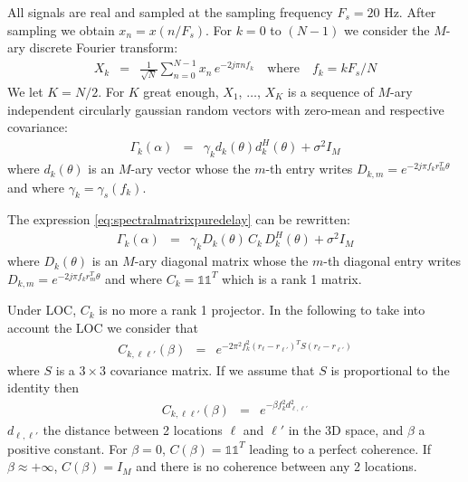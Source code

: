 \documentclass[a4paper, 12pt]{report}
\newcommand{\diag}[1]{\mathrm{diag}\left( #1 \right)}
\begin{document}
All signals are real and sampled at the sampling frequency  $F_{s}=20$ Hz. After sampling we obtain $x_{n}=x(n/F_{s})$. For $k=0$ to $(N-1)$ we consider the $M$-ary discrete Fourier transform:
 \begin{eqnarray*}
 X_{k}&=&\frac{1}{\sqrt{N}}\sum_{n=0}^{N-1}x_{n}\,e^{-2j\pi n f_{k}}
    \quad\mathrm{where}\quad
 f_{k}=kF_{s}/N
 \end{eqnarray*}
We let $K=N/2$.
For $K$ great enough, $X_{1}$, $\ldots$, $X_{K}$ is a sequence of  $M$-ary independent circularly gaussian random vectors with zero-mean and respective covariance:
\begin{eqnarray}
\label{eq:spectralmatrixpuredelay}
\Gamma_{k}(\alpha)&=&\gamma_{k}d_{k}(\theta)d_{k}^{H}(\theta)+\sigma^{2}I_{M}
\end{eqnarray}
where $d_{k}(\theta)$ is an $M$-ary vector whose the $m$-th entry writes $D_{k,m}=e^{-2j\pi f_{k} r_{m}^{T}\theta }$ and where $\gamma_{k}=\gamma_{s}(f_{k})$.

The expression \eqref{eq:spectralmatrixpuredelay} can be rewritten:
\begin{eqnarray}
\label{eq:spectralmatrixLOC}
\Gamma_{k}(\alpha)&=&\gamma_{k}D_{k}(\theta)\, C_{k}\,D_{k}^{H}(\theta)+\sigma^{2}I_{M}
\end{eqnarray}
where $D_{k}(\theta)$ is an $M$-ary diagonal matrix whose the $m$-th diagonal entry writes $D_{k,m}=e^{-2j\pi f_{k} r_{m}^{T}\theta }$ and where $C_{k}=\mathds{1}\mathds{1}^{T}$ which is a rank 1 matrix.


Under LOC, $C_{k}$ is no more a rank 1 projector.  In the following to take into account the LOC we consider that 
\begin{eqnarray}
 \label{eq:CkwithGauss}
 C_{k,\ell\ell'} (\beta)&=&e^{-2\pi^2f_k^2(r_{\ell}-r_{\ell'})^TS(r_{\ell}-r_{\ell'})}
\end{eqnarray}
where $S$ is a $3\times 3$ covariance matrix. If we assume that $S$ is proportional to the identity then
\begin{eqnarray}
 \label{eq:CkwithGauss-2}
 C_{k,\ell\ell'} (\beta)&=&e^{-\beta f_k^2 d_{\ell,\ell'}^2}
\end{eqnarray}
$d_{\ell,\ell'}$ the distance between 2 locations $\ell$ and $\ell'$ in the 3D space, and $\beta$ a positive constant. For $\beta=0$, $C(\beta)=\mathds{1}\mathds{1}^{T}$ leading to a perfect coherence. If $\beta\approx+\infty$, $C(\beta)=I_{M}$ and there is no coherence between any 2 locations.
\end{document}
